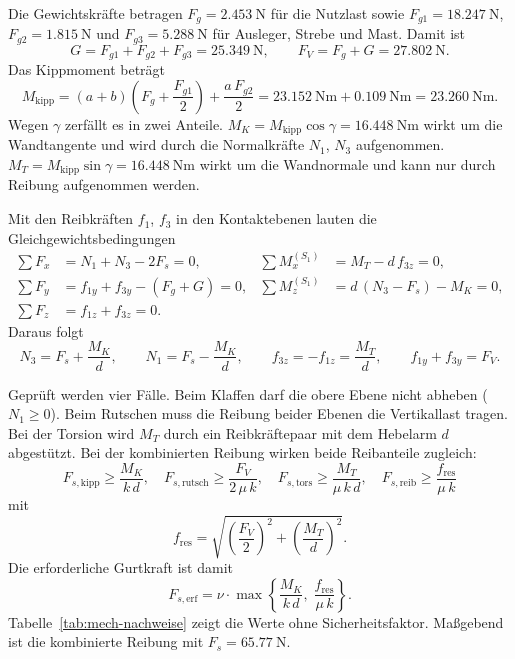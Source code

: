 Die Gewichtskräfte betragen $F_g = \SI{2,453}{\newton}$ für die Nutzlast sowie $F_{g1} = \SI{18,247}{\newton}$, $F_{g2} = \SI{1,815}{\newton}$ und $F_{g3} = \SI{5,288}{\newton}$ für Ausleger, Strebe und Mast. Damit ist
\begin{equation}
    G = F_{g1} + F_{g2} + F_{g3} = \SI{25,349}{\newton}, \qquad
    F_V = F_g + G = \SI{27,802}{\newton}.
\end{equation}
Das Kippmoment beträgt
\begin{equation}
    M_{\mathrm{kipp}} = (a + b)\left(F_g + \frac{F_{g1}}{2}\right) + \frac{a \, F_{g2}}{2}
    = \SI{23,152}{\newton\metre} + \SI{0,109}{\newton\metre} = \SI{23,260}{\newton\metre}.
\end{equation}
Wegen $\gamma$ zerfällt es in zwei Anteile. $M_K = M_{\mathrm{kipp}} \cos\gamma = \SI{16,448}{\newton\metre}$ wirkt um die Wandtangente und wird durch die Normalkräfte $N_1$, $N_3$ aufgenommen. $M_T = M_{\mathrm{kipp}} \sin\gamma = \SI{16,448}{\newton\metre}$ wirkt um die Wandnormale und kann nur durch Reibung aufgenommen werden.

Mit den Reibkräften $f_1$, $f_3$ in den Kontaktebenen lauten die Gleichgewichtsbedingungen
\begin{align}
    \textstyle\sum F_x &= N_1 + N_3 - 2F_s = 0, &
    \textstyle\sum M_x^{(S_1)} &= M_T - d\,f_{3z} = 0, \\
    \textstyle\sum F_y &= f_{1y} + f_{3y} - (F_g + G) = 0, &
    \textstyle\sum M_z^{(S_1)} &= d\,(N_3 - F_s) - M_K = 0, \\
    \textstyle\sum F_z &= f_{1z} + f_{3z} = 0 .
\end{align}
Daraus folgt
\begin{equation}
    N_3 = F_s + \frac{M_K}{d}, \qquad N_1 = F_s - \frac{M_K}{d}, \qquad
    f_{3z} = -f_{1z} = \frac{M_T}{d}, \qquad f_{1y} + f_{3y} = F_V .
\end{equation}

Geprüft werden vier Fälle. Beim Klaffen darf die obere Ebene nicht abheben ($N_1 \ge 0$). Beim Rutschen muss die Reibung beider Ebenen die Vertikallast tragen. Bei der Torsion wird $M_T$ durch ein Reibkräftepaar mit dem Hebelarm $d$ abgestützt. Bei der kombinierten Reibung wirken beide Reibanteile zugleich:
\begin{equation}
    F_{s,\mathrm{kipp}} \ge \frac{M_K}{k\,d}, \quad
    F_{s,\mathrm{rutsch}} \ge \frac{F_V}{2\,\mu\,k}, \quad
    F_{s,\mathrm{tors}} \ge \frac{M_T}{\mu\,k\,d}, \quad
    F_{s,\mathrm{reib}} \ge \frac{f_{\mathrm{res}}}{\mu\,k}
\end{equation}
mit
\begin{equation}
    f_{\mathrm{res}} = \sqrt{\left(\frac{F_V}{2}\right)^2 + \left(\frac{M_T}{d}\right)^2} .
\end{equation}
Die erforderliche Gurtkraft ist damit
\begin{equation}
    F_{s,\mathrm{erf}} = \nu \cdot \max\left\{ \frac{M_K}{k\,d},\;
    \frac{f_{\mathrm{res}}}{\mu\,k} \right\} .
\end{equation}
Tabelle~\ref{tab:mech-nachweise} zeigt die Werte ohne Sicherheitsfaktor. Maßgebend ist die kombinierte Reibung mit $F_s = \SI{65,77}{\newton}$.

